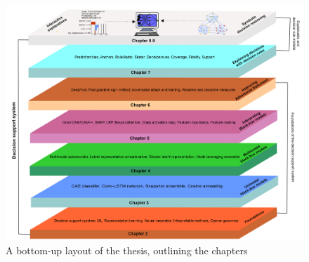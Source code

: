 \begin{figure}
	\centering
		\includegraphics[scale=0.6]{images/chapter_outline.png}
		\caption{A bottom-up layout of the thesis, outlining the chapters}
        \label{fig:chapter_organization}
\end{figure}

